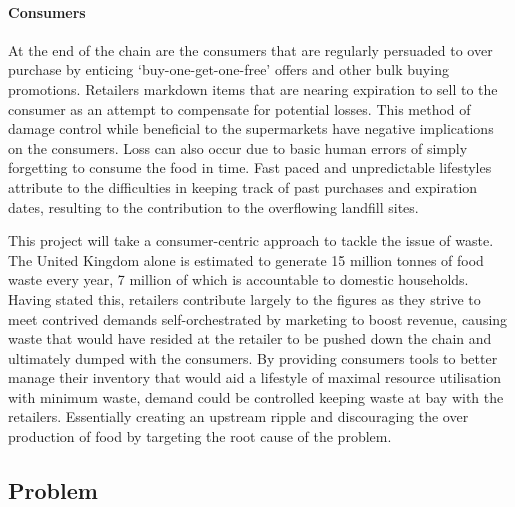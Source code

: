 \documentclass[a4paper, 11pt]{article}
\begin{document}
\paragraph{Consumers}At the end of the chain are the consumers that are regularly persuaded to over purchase by enticing `buy-one-get-one-free' offers and other bulk buying promotions. Retailers markdown items that are nearing expiration to sell  to the consumer as an attempt to compensate for potential losses. This method of damage control while beneficial to the supermarkets have negative implications on the consumers. Loss can also occur due to basic human errors of simply forgetting to consume the food in time. Fast paced and unpredictable lifestyles attribute to the difficulties in keeping track of past purchases and expiration dates, resulting to the  contribution to the overflowing landfill sites. 

\vspace{\baselineskip}

This project will take a consumer-centric approach to tackle the issue of waste. The United Kingdom alone is estimated to generate 15 million tonnes of food waste every year, 7 million of which is accountable to domestic households.\cite{FoodWaste} Having stated this, retailers contribute largely to the figures as they strive to meet contrived demands self-orchestrated by marketing to boost revenue, causing waste that would have resided at the retailer to be pushed down the chain and ultimately dumped with the consumers. By providing consumers tools to better manage their inventory that would aid a lifestyle of maximal resource utilisation with minimum waste, demand could be controlled keeping waste at bay with the retailers. Essentially creating an upstream ripple and discouraging the over production of food by targeting the root cause of the problem.

\vspace{\baselineskip}
\vspace{\baselineskip}
\vspace{\baselineskip}

\subsection{Problem}

\begin{center}
\cite{FoodWaste}
\end{center}
\end{document}
